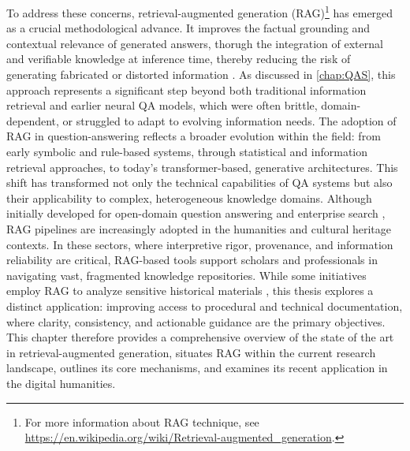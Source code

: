 \begin{spacing}{1.5}
To address these concerns, retrieval-augmented generation (RAG)\footnote{For more information about RAG technique, see \url{https://en.wikipedia.org/wiki/Retrieval-augmented_generation}.} has emerged as a crucial methodological advance. It improves the factual grounding and contextual relevance of generated answers, thorugh the integration of external and verifiable knowledge at inference time, thereby reducing the risk of generating fabricated or distorted information \citep{martineau_what_2023}. As discussed in \autoref{chap:QAS}, this approach represents a significant step beyond both traditional information retrieval and earlier neural QA models, which were often brittle, domain-dependent, or struggled to adapt to evolving information needs.
\sloppy
The adoption of RAG in question-answering reflects a broader evolution within the field: from early symbolic and rule-based systems, through statistical and information retrieval approaches, to today’s transformer-based, generative architectures. This shift has transformed not only the technical capabilities of QA systems but also their applicability to complex, heterogeneous knowledge domains.
\sloppy
Although initially developed for open-domain question answering and enterprise search \parencite{akkiraju_facts_2024, jiang_towards_2024, packowski_optimizing_2024, yang_ragva_2025, zhou_enabling_2025}, RAG pipelines are increasingly adopted in the humanities and cultural heritage contexts. In these sectors, where interpretive rigor, provenance, and information reliability are critical, RAG-based tools support scholars and professionals in navigating vast, fragmented knowledge repositories. While some initiatives employ RAG to analyze sensitive historical materials \citep{callaghan_prototyping_2025, ciletti_retrieval-augmented_2025, sergeev_talking_2025, fan_research_2025}, this thesis explores a distinct application: improving access to procedural and technical documentation, where clarity, consistency, and actionable guidance are the primary objectives.
\\

This chapter therefore provides a comprehensive overview of the state of the art in retrieval-augmented generation, situates RAG within the current research landscape, outlines its core mechanisms, and examines its recent application in the digital humanities.


\end{spacing}
